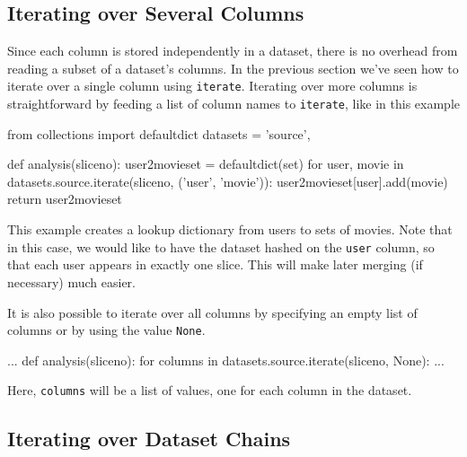 \subsection{Iterating over Several Columns}
Since each column is stored independently in a dataset, there is no
overhead from reading a subset of a dataset's columns.  In the
previous section we've seen how to iterate over a single column using
\texttt{iterate}.  Iterating over more columns is straightforward by
feeding a list of column names to \texttt{iterate}, like in this
example
\begin{python}
from collections import defaultdict
datasets = {'source',}

def analysis(sliceno):
    user2movieset = defaultdict(set)
    for user, movie in datasets.source.iterate(sliceno, ('user', 'movie')):
        user2movieset[user].add(movie)
    return user2movieset
\end{python}
This example creates a lookup dictionary from users to sets of movies.
Note that in this case, we would like to have the dataset hashed on
the \texttt{user} column, so that each user appears in exactly one slice.
This will make later merging (if necessary) much easier.

It is also possible to iterate over all columns by specifying an empty
list of columns or by using the value \texttt{None}.
\begin{python}
...
def analysis(sliceno):
    for columns in datasets.source.iterate(sliceno, None):
        ...
\end{python}
Here, \texttt{columns} will be a list of values, one for each column
in the dataset.


\subsection{Iterating over Dataset Chains}

